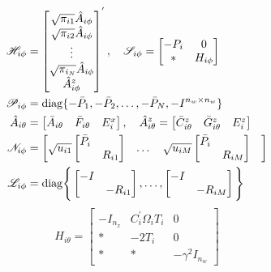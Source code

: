 \documentclass[conference]{IEEEtran}
\begin{document}
\begin{equation}\notag
\begin{aligned}
	\mathscr{H}_{i\phi}&=\begin{bmatrix}
		\sqrt{\pi_{i1}}\hat{A}_{i\phi}\\
		\sqrt{\pi_{i2}}\hat{A}_{i\phi}\\
		\vdots\\
		\sqrt{\pi_{i_N}}\hat{A}_{i\phi}\\
		\hat{A}^{z}_{i\phi}
		\end{bmatrix}^{'}, \quad
	\mathscr{S}_{i\phi}=\begin{bmatrix}
		-P_{i}&0\\
		*&H_{i\phi}
	\end{bmatrix}\\
\mathscr{P}_{i\phi}&=\mathrm{diag}\{-\bar{P}_{1},-\bar{P}_{2},\dots,-\bar{P}_{N},-I^{n_w\times n_w}  \}\\
\hat{A}_{i\theta}&=\begin{bmatrix}
\bar{A}_{i\theta}&\bar{F}_{i\theta}&E^{x}_{i}
\end{bmatrix},\quad
\hat{A}^{z}_{i\theta}=\begin{bmatrix}
\bar{C}^{z}_{i\theta}&\bar{G}^{z}_{i\theta}&E^{z}_{i}
\end{bmatrix}  \\
\mathscr{N}_{i\phi}&=\begin{bmatrix}
\sqrt{u_{i1}}\begin{bmatrix}
\bar{P}_{i}&\\
&R_{i1}
\end{bmatrix}&
\dots&	
\sqrt{u_{iM}}\begin{bmatrix}
\bar{P}_{i}&\\
&R_{iM}
\end{bmatrix}&
\end{bmatrix} \\
\mathscr{L}_{i\phi}&=\mathrm{diag}\Bigg\{\begin{bmatrix}
-I&\\
&-R_{i1}
\end{bmatrix},\dots,
\begin{bmatrix}
-I&\\
&-R_{iM}
\end{bmatrix}  \Bigg\}
\end{aligned}
\end{equation}
\begin{equation*}
H_{i\theta}=\begin{bmatrix}
-I_{n_x}&C^{'}_{i}\varOmega_{i}T_{i}&0\\
*&-2T_{i}&0\\
*&*&-\gamma^{2}I_{n_w}
\end{bmatrix}
\end{equation*}
\end{document}
